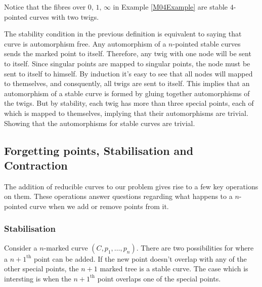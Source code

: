 Notice that the fibres over $0,\,1,\,\infty$ in Example \ref{M04Example} are stable $4$-pointed curves with two twigs.

\begin{remark}
 \par The stability condition in the previous definition is equivalent to saying that curve is automorphism free.
Any automorphism of a $n$-pointed stable curves sends the marked point to itself. 
Therefore, any twig with one node will be sent to itself. 
Since singular points are mapped to singular points, the node must be sent to itself to himself.
By induction it's easy to see that all nodes will mapped to themselves, and consquently, all twigs are sent to itself.
This implies that an automorphism of a stable curve is formed by gluing together automorphisms of the twigs.
But by stability, each twig has more than three special points, each of which is mapped to themselves, implying that their automorphisms are trivial.
Showing that the automorphisms for stable curves are trivial.
\end{remark}
\subsection{Forgetting points, Stabilisation and Contraction}
The addition of reducible curves to our problem gives rise to a few key operations on them.
These operations answer questions regarding what happens to a $n$-pointed curve when we add or remove points from it.
\subsubsection{Stabilisation}
Consider a $n$-marked curve $(C, p_{1}, \dots, p_{n})$.
There are two possibilities for where a $n+1^{\text{th}}$ point can be added.
If the new point doesn't overlap with any of the other special points, the $n+1$ marked tree is a stable curve.
The case which is intersting is when the $n+1^{\text{th}}$ point overlaps one of the special points.

